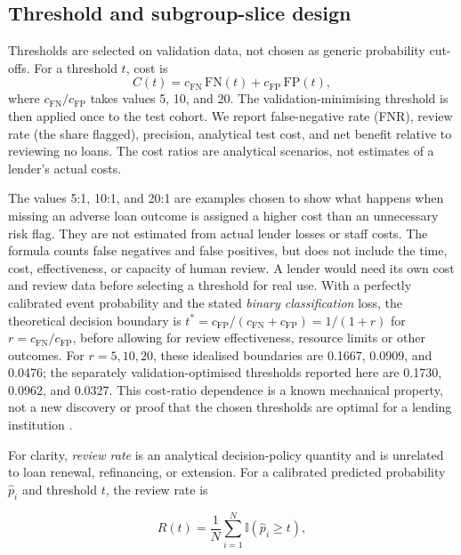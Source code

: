 \documentclass[10pt]{article}
\begin{document}
\subsection{Threshold and subgroup-slice design}

Thresholds are selected on validation data, not chosen as generic probability cut-offs. For a threshold $t$, cost is
\[
  C(t)=c_{\mathrm{FN}}\,\mathrm{FN}(t)+c_{\mathrm{FP}}\,\mathrm{FP}(t),
\]
where $c_{\mathrm{FN}}/c_{\mathrm{FP}}$ takes values 5, 10, and 20. The validation-minimising threshold is then applied once to the test cohort. We report false-negative rate (FNR), review rate (the share flagged), precision, analytical test cost, and net benefit relative to reviewing no loans. The cost ratios are analytical scenarios, not estimates of a lender's actual costs.

The values 5:1, 10:1, and 20:1 are examples chosen to show what happens when missing an adverse loan outcome is assigned a higher cost than an unnecessary risk flag. They are not estimated from actual lender losses or staff costs. The formula counts false negatives and false positives, but does not include the time, cost, effectiveness, or capacity of human review. A lender would need its own cost and review data before selecting a threshold for real use. With a perfectly calibrated event probability and the stated \emph{binary classification} loss, the theoretical decision boundary is $t^{*}=c_{\mathrm{FP}}/(c_{\mathrm{FN}}+c_{\mathrm{FP}})=1/(1+r)$ for $r=c_{\mathrm{FN}}/c_{\mathrm{FP}}$, before allowing for review effectiveness, resource limits or other outcomes. For $r=5,10,20$, these idealised boundaries are 0.1667, 0.0909, and 0.0476; the separately validation-optimised thresholds reported here are 0.1730, 0.0962, and 0.0327. This cost-ratio dependence is a known mechanical property, not a new discovery or proof that the chosen thresholds are optimal for a lending institution \cite{ref57,ref58}.

For clarity, \emph{review rate} is an analytical decision-policy quantity and is unrelated to loan renewal, refinancing, or extension. For a calibrated predicted probability $\hat p_i$ and threshold $t$, the review rate is

\[
R(t)=\frac{1}{N}\sum_{i=1}^{N}\mathbb{I}(\hat p_i \geq t),
\]
\end{document}
